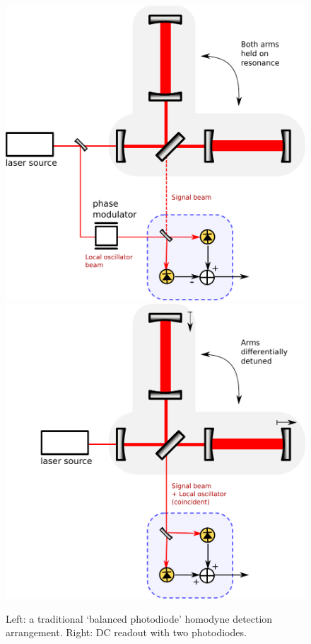 \begin{figure}
\includegraphics[width=0.5\columnwidth]{figures/homodyne-standard.pdf}
\includegraphics[width=0.5\columnwidth]{figures/homodyne-dc.pdf}
\caption[Comparison of DC readout with balanced homodyne
  detection]{Left: a traditional `balanced photodiode' homodyne
  detection arrangement. Right: DC readout with two photodiodes.
  \label{fig:balanced-homodyne}
}
\end{figure}

